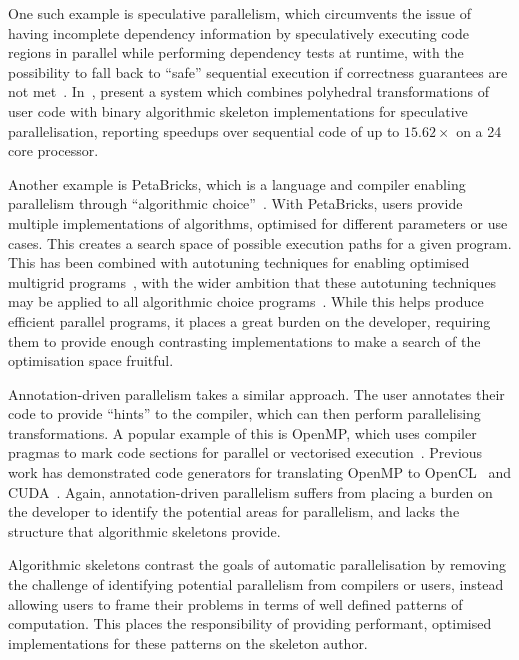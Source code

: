 One such example is speculative parallelism, which circumvents the
issue of having incomplete dependency information by speculatively
executing code regions in parallel while performing dependency tests
at runtime, with the possibility to fall back to ``safe'' sequential
execution if correctness guarantees are not
met~\cite{Prabhu2010,Trachsel2010}.  In~\cite{Jimborean2014},
\citeauthor{Jimborean2014} present a system which combines polyhedral
transformations of user code with binary algorithmic skeleton
implementations for speculative parallelisation, reporting speedups
over sequential code of up to $15.62\times$ on a 24 core processor.

Another example is PetaBricks, which is a language and compiler
enabling parallelism through ``algorithmic choice''~\cite{Ansel2009,
  Ansel2010}. With PetaBricks, users provide multiple implementations
of algorithms, optimised for different parameters or use cases. This
creates a search space of possible execution paths for a given
program. This has been combined with autotuning techniques for
enabling optimised multigrid programs~\cite{Chan2009}, with the wider
ambition that these autotuning techniques may be applied to all
algorithmic choice programs~\cite{Ansel2014}. While this helps produce
efficient parallel programs, it places a great burden on the
developer, requiring them to provide enough contrasting
implementations to make a search of the optimisation space fruitful.

Annotation-driven parallelism takes a similar approach. The user
annotates their code to provide ``hints'' to the compiler, which can
then perform parallelising transformations. A popular example of this
is OpenMP, which uses compiler pragmas to mark code sections for
parallel or vectorised execution~\cite{Dagum1998}. Previous work has
demonstrated code generators for translating OpenMP to
OpenCL~\cite{Grewe2013} and CUDA~\cite{Lee2009}. Again,
annotation-driven parallelism suffers from placing a burden on the
developer to identify the potential areas for parallelism, and lacks
the structure that algorithmic skeletons provide.

Algorithmic skeletons contrast the goals of automatic parallelisation
by removing the challenge of identifying potential parallelism from
compilers or users, instead allowing users to frame their problems in
terms of well defined patterns of computation. This places the
responsibility of providing performant, optimised implementations for
these patterns on the skeleton author.


